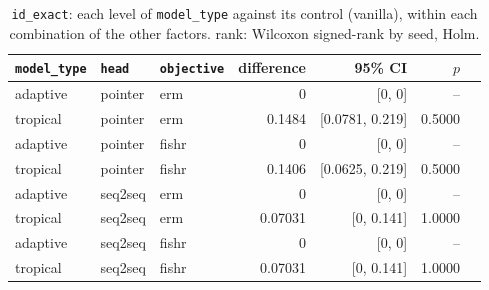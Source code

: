 \documentclass[10pt]{article}
\begin{document}
{\small
\begin{longtable}{lllrrrl}
\caption{\texttt{id\_exact}: each level of \texttt{model\_type} against its control (vanilla), within each combination of the other factors. rank: Wilcoxon signed-rank by seed, Holm.}\label{tab:control-id_exact}\\
\toprule
\texttt{model\_type} & \texttt{head} & \texttt{objective} & difference & 95\% CI & $p$ & \\
\midrule
\endhead
adaptive & pointer & erm & 0 & [0, 0] & -- & \\
tropical & pointer & erm & 0.1484 & [0.0781, 0.219] & 0.5000 & \\
adaptive & pointer & fishr & 0 & [0, 0] & -- & \\
tropical & pointer & fishr & 0.1406 & [0.0625, 0.219] & 0.5000 & \\
adaptive & seq2seq & erm & 0 & [0, 0] & -- & \\
tropical & seq2seq & erm & 0.07031 & [0, 0.141] & 1.0000 & \\
adaptive & seq2seq & fishr & 0 & [0, 0] & -- & \\
tropical & seq2seq & fishr & 0.07031 & [0, 0.141] & 1.0000 & \\
\bottomrule
\end{longtable}
}
\end{document}
